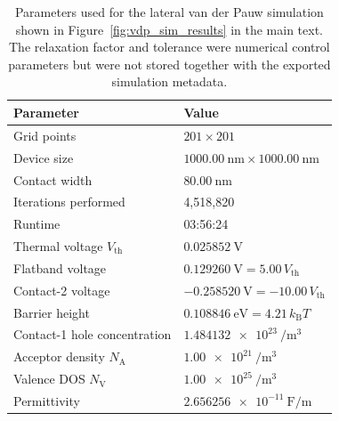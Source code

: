 \begin{appendix}
\begin{table}[htbp]
    \centering
    \begin{tabular}{|p{}|p{}|}
        \hline
        Parameter & Value \\
        \hline
        Grid points & $201\times201$ \\
        Device size & $\SI{1000.00}{\nano\metre}\times\SI{1000.00}{\nano\metre}$ \\
        Contact width & $\SI{80.00}{\nano\metre}$ \\
        Iterations performed & 4,518,820 \\
        Runtime & 03:56:24 \\
        Thermal voltage $V_\mathrm{th}$ & $\SI{0.025852}{\volt}$ \\
        Flatband voltage & $\SI{0.129260}{\volt}=5.00\,V_\mathrm{th}$ \\
        Contact-2 voltage & $\SI{-0.258520}{\volt}=-10.00\,V_\mathrm{th}$ \\
        Barrier height & $\SI{0.108846}{\electronvolt}=4.21\,k_\mathrm{B}T$ \\
        Contact-1 hole concentration & $\SI{1.484132e23}{\per\cubic\metre}$ \\
        Acceptor density $N_\mathrm{A}$& $\SI{1.00e21}{\per\cubic\metre}$ \\
        Valence DOS $N_\mathrm{V}$ & $\SI{1.00e25}{\per\cubic\metre}$ \\
        Permittivity & $\SI{2.656256e-11}{\farad\per\metre}$ \\
        \hline
    \end{tabular}
    \caption[Parameters used in the lateral van der Pauw simulation]{Parameters
    used for the lateral van der Pauw simulation shown in
    Figure~\ref{fig:vdp_sim_results} in the main text. The relaxation factor and tolerance were
    numerical control parameters but were not stored together with the exported
    simulation metadata.}
    \label{tab:vdp_sim_parameters}
\end{table}


\end{appendix}
